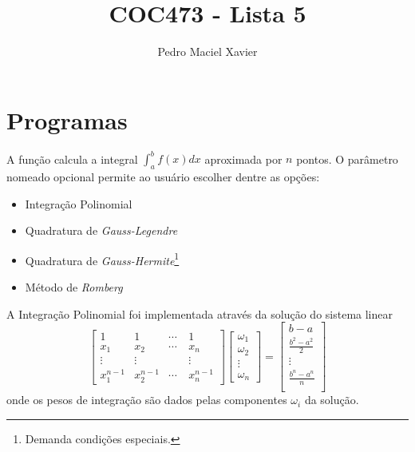 \documentclass{homework}
\title{COC473 - Lista 5}
\author{Pedro Maciel Xavier}
\begin{document}
	
	\maketitle
	
	\section*{Programas}
	
	
	A função  calcula a integral $\int_{a}^{b} f(x) dx$ aproximada por $n$ pontos. O parâmetro nomeado opcional  permite ao usuário escolher dentre as opções:
	\begin{itemize}[leftmargin=100pt]
		\item[\code{'polynomial'}] Integração Polinomial
		\item[\code{'gauss-legendre'}] Quadratura de \textit{Gauss-Legendre}
		\item[\code{'gauss-hermite'}] Quadratura de \textit{Gauss-Hermite}\footnote{Demanda condições especiais.}
		\item[\code{'romberg'}] Método de \textit{Romberg}
	\end{itemize}
	
	
	
	\newpage
	
	
	A Integração Polinomial foi implementada através da solução do sistema linear
	$${\displaystyle%
			\begin{bmatrix}
				1 & 1  & \cdots & 1 \\
				x_1 & x_2 & \cdots & x_n \\
				\vdots & \vdots & \quad & \vdots \\
				x_{1}^{n-1} & x_{2}^{n-1} & \cdots & x_{n}^{n-1}
			\end{bmatrix}%
			\begin{bmatrix}
				\omega_1\\
				\omega_2\\
				\vdots\\
				\omega_n
			\end{bmatrix} =%
			\begin{bmatrix}
				b - a\\
				\frac{b^2 - a^2}{2}\\
				\vdots\\
				\frac{b^n - a^n}{n}\\
			\end{bmatrix}}$$
	onde os pesos de integração são dados pelas componentes $\omega_i$ da solução.
	
\end{document}
